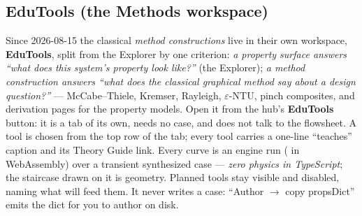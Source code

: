 \documentclass[11pt,a4paper]{article}
\begin{document}
\subsection{EduTools (the Methods workspace)}
Since 2026-08-15 the classical \emph{method constructions} live in their own
workspace, \textbf{EduTools}, split from the Explorer by one criterion:
\emph{a property surface answers ``what does this system's property look
like?''} (the Explorer); \emph{a method construction answers ``what does
the classical graphical method say about a design question?''} ---
McCabe--Thiele, Kremser, Rayleigh, $\varepsilon$-NTU, pinch composites,
and derivation pages for the property models.  Open it from the
hub's \textbf{EduTools} button: it is a tab of its own, needs no case, and
does not talk to the flowsheet.  A tool is chosen from the top row of the
tab; every tool carries a one-line ``teaches'' caption and its Theory Guide
link.  Every curve is an engine run ( in WebAssembly) over
a transient synthesized case --- \emph{zero physics in TypeScript}; the
staircase drawn on it is geometry.  Planned tools stay visible and
disabled, naming what will feed them.  It never writes a case: ``Author
$\to$ copy propsDict'' emits the dict for you to author on disk.
\end{document}
